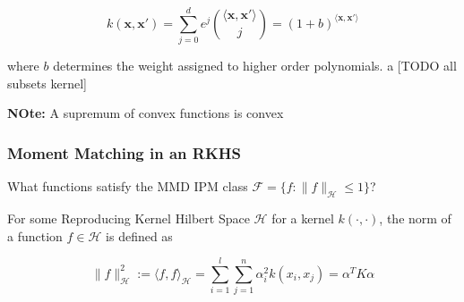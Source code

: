 \documentclass[
]{article}
\begin{document}
\[k (\mathbf{x}, \mathbf{x}') = \sum_{j=0}^d e^j \binom{\langle\mathbf{x}, \mathbf{x}'\rangle}{j}
=(1+b)^{ \langle \mathbf{x}, \mathbf{x}'\rangle}\]


where \(b\) determines the weight assigned to higher order polynomials.
a
{[}TODO all subsets kernel{]}

\textbf{NOte:} A supremum of convex functions is convex

\subsubsection{Moment Matching in an RKHS}

What functions satisfy the MMD IPM class  $\mathcal{F}= \{f: \|f\|_\mathcal{H} \leq 1 \}$? 

For some Reproducing Kernel Hilbert Space $\mathcal{H}$ for a kernel $k(\cdot,\cdot)$, the norm of a function $f \in \mathcal{H}$ is defined as 

\begin{equation}
    \| f \|^2_\mathcal{H} := \langle f, f \rangle _\mathcal{H} = \sum_{i=1}^l \sum_{j=1}^n \alpha_i^2 k(x_i, x_j) = \alpha^TK\alpha
\end{equation}



\end{document}
